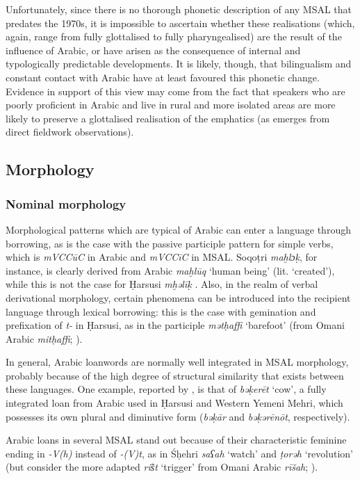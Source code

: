 \documentclass[output=paper]{langsci/langscibook}
\begin{document}
Unfortunately, since there is no thorough phonetic description of any MSAL that predates the 1970s, it is impossible to ascertain whether these realisations (which, again, range from fully glottalised to fully pharyngealised) are the result of the influence of Arabic, or have arisen as the consequence of internal and typologically predictable developments. It is likely, though, that bilingualism and constant contact with Arabic have at least favoured this phonetic change. Evidence in support of this view may come from the fact that speakers who are poorly proficient in Arabic and live in rural and more isolated areas are more likely to preserve a glottalised realisation of the emphatics (as emerges from direct fieldwork observations).


 
 \subsection{Morphology} 
 \subsubsection{Nominal morphology}\label{sec:key:nomorph}

Morphological patterns which are typical of Arabic can enter a language through borrowing, as is the case with the passive participle pattern for simple verbs, which is \textit{mVCCūC} in Arabic and \textit{mVCCīC} in MSAL. Soqoṭri \textit{maḫlɔḳ}, for instance, is clearly derived from Arabic \textit{maḫlūq} ‘human being’ (lit. ‘created’), while this is not the case for Ḥarsusi \textit{mḫəlīḳ} \citep[299]{Lonnet2011}. Also, in the realm of verbal derivational morphology, certain phenomena can be introduced into the recipient language through lexical borrowing: this is the case with gemination and prefixation of \textit{t-} in Ḥarsusi, as in the participle \textit{mətḥaffi} ‘barefoot’ (from Omani Arabic \textit{mitḥaffi}; \citealt{Lonnet2011}).

In general, Arabic loanwords are normally well integrated in MSAL morphology, probably because of the high degree of structural similarity that exists between these languages. One example, reported by \citet{Lonnet2011}, is that of \textit{bəḳerēt} ‘cow’, a fully integrated loan from Arabic used in Ḥarsusi and Western Yemeni Mehri, which possesses its own plural and diminutive form (\textit{bəḳār} and \textit{bəḳərēnōt}, respectively).

Arabic loans in several MSAL stand out because of their characteristic feminine ending in \textit{-V(h)} instead of \textit{-(V)t}, as in Śḥehri \textit{saʕah} ‘watch’ and \textit{ṭorəh} ‘revolution’ (but consider the more adapted \textit{ris͂t} ‘trigger’ from Omani Arabic \textit{rīšah}; \citealt{Lonnet2011}). 
\end{document}
